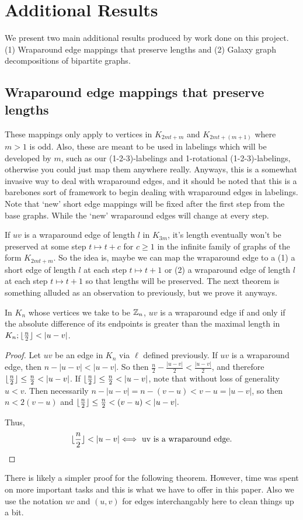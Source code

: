 \chapter{Additional Results} \label{chap:Additional Results}

We present two main additional results produced by work done on this project. (1) Wraparound edge mappings that preserve lengths and (2) Galaxy graph decompositions of bipartite graphs.

\section{Wraparound edge mappings that preserve lengths}

These mappings only apply to vertices in $K_{2mt+m}$ and $K_{2mt+(m+1)}$ where $m>1$ is odd. Also, these are meant to be used in labelings which will be developed by $m$, such as our (1-2-3)-labelings and 1-rotational (1-2-3)-labelings, otherwise you could just map them anywhere really. Anyways, this is a somewhat invasive way to deal with wraparound edges, and it should be noted that this is a barebones sort of framework to begin dealing with wraparound edges in labelings. Note that `new' short edge mappings will be fixed after the first step from the base graphs. While the `new' wraparound edges will change at every step.

If $uv$ is a wraparound edge of length $l$ in $K_{3m}$, it's length eventually won't be preserved at some step $t\mapsto t+c$ for $c\geq 1$ in the infinite family of graphs of the form $K_{2mt+m}$. So the idea is, maybe we can map the wraparound edge to a (1) a short edge of length $l$ at each step $t\mapsto t+1$ or (2) a wraparound edge of length $l$ at each step $t\mapsto t+1$ so that lengths will be preserved. The next theorem is something alluded as an observation to previously, but we prove it anyways.\newpage
\begin{thm} \label{thm:wraplarger}
    In $K_{n}$ whose vertices we take to be $\mathbb{Z}_{n}$, $uv$ is a wraparound edge if and only if the absolute difference of its endpoints is greater than the maximal length in $K_{n};\floor{\frac{n}{2}}<|u-v|$. 
    \begin{proof}
        Let $uv$ be an edge in $K_{n}$ via $\ell$ defined previously. If $uv$ is a wraparound edge, then $n-|u-v|<|u-v|$. So then $\frac{n}{2}-\frac{|u-v|}{2}<\frac{|u-v|}{2}$, and therefore $\floor{\frac{n}{2}}\leq \frac{n}{2}<|u-v|$. If $\floor{\frac{n}{2}}\leq \frac{n}{2}<|u-v|$, note that without loss of generality $u<v$. Then necessarily $n-|u-v|=n-(v-u)<v-u=|u-v|$, so then $n<2(v-u)$ and $\floor{\frac{n}{2}}\leq\frac{n}{2}<(v-u)<|u-v|.$
    
        Thus,
        $$\floor{\frac{n}{2}}<|u-v|\Longleftrightarrow\text{ uv is a wraparound edge.}$$
    \end{proof}
    \end{thm}
There is likely a simpler proof for the following theorem. However, time was spent on more important tasks and this is what we have to offer in this paper. Also we use the notation $uv$ and $(u,v)$ for edges interchangably here to clean things up a bit.

